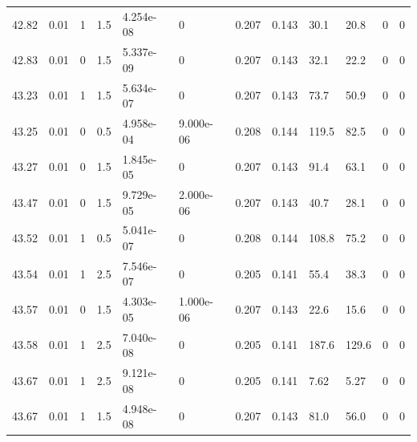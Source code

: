 \documentclass[preview]{standalone}
\begin{document}
{{{{{{{{{{{{{\begin{tabular}{L{1.2cm}C{1.2cm} C{0.3cm}C{0.5cm} C{1.4cm}C{1.4cm} C{1.4cm}C{1.4cm} C{1.6cm}C{1.6cm} C{1.6cm}C{1.6cm}}
  42.82  &  0.01  & 1     & 1.5 &  4.254e-08  & 0  &  0.207&   0.143& 30.1 & 20.8   &  0 & 0  \\ 
  42.83  &  0.01  & 0     & 1.5 &  5.337e-09  & 0  &  0.207&   0.143& 32.1 & 22.2   &  0 & 0  \\ 
  43.23  &  0.01  & 1     & 1.5 &  5.634e-07  & 0  &  0.207&   0.143& 73.7 & 50.9   &  0 & 0  \\ 
  43.25  &  0.01  & 0     & 0.5 &  4.958e-04  & 9.000e-06  &  0.208&   0.144& 119.5 & 82.5   &  0 & 0  \\ 
  43.27  &  0.01  & 0     & 1.5 &  1.845e-05  & 0  &  0.207&   0.143& 91.4 & 63.1   &  0 & 0  \\ 
  43.47  &  0.01  & 0     & 1.5 &  9.729e-05  & 2.000e-06  &  0.207&   0.143& 40.7 & 28.1   &  0 & 0  \\ 
  43.52  &  0.01  & 1     & 0.5 &  5.041e-07  & 0  &  0.208&   0.144& 108.8 & 75.2   &  0 & 0  \\ 
  43.54  &  0.01  & 1     & 2.5 &  7.546e-07  & 0  &  0.205&   0.141& 55.4 & 38.3   &  0 & 0  \\ 
  43.57  &  0.01  & 0     & 1.5 &  4.303e-05  & 1.000e-06  &  0.207&   0.143& 22.6 & 15.6   &  0 & 0  \\ 
  43.58  &  0.01  & 1     & 2.5 &  7.040e-08  & 0  &  0.205&   0.141& 187.6 & 129.6   &  0 & 0  \\ 
  43.67  &  0.01  & 1     & 2.5 &  9.121e-08  & 0  &  0.205&   0.141& 7.62 & 5.27   &  0 & 0  \\ 
  43.67  &  0.01  & 1     & 1.5 &  4.948e-08  & 0  &  0.207&   0.143& 81.0 & 56.0   &  0 & 0  \\ 
\hline 
\end{tabular} 

}}}}}}}}}}}}}
\end{document}
